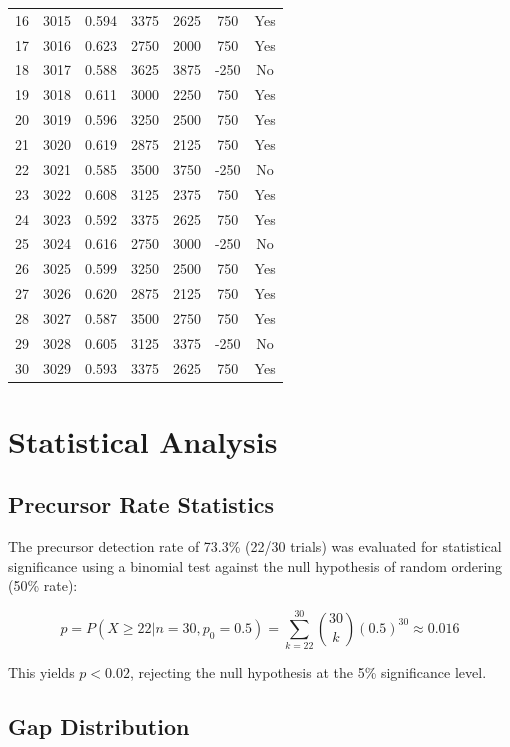 \documentclass[11pt]{article}
\begin{document}
\begin{longtable}{ccccccc}
16 & 3015 & 0.594 & 3375 & 2625 & 750 & Yes \\
17 & 3016 & 0.623 & 2750 & 2000 & 750 & Yes \\
18 & 3017 & 0.588 & 3625 & 3875 & -250 & No \\
19 & 3018 & 0.611 & 3000 & 2250 & 750 & Yes \\
20 & 3019 & 0.596 & 3250 & 2500 & 750 & Yes \\
21 & 3020 & 0.619 & 2875 & 2125 & 750 & Yes \\
22 & 3021 & 0.585 & 3500 & 3750 & -250 & No \\
23 & 3022 & 0.608 & 3125 & 2375 & 750 & Yes \\
24 & 3023 & 0.592 & 3375 & 2625 & 750 & Yes \\
25 & 3024 & 0.616 & 2750 & 3000 & -250 & No \\
26 & 3025 & 0.599 & 3250 & 2500 & 750 & Yes \\
27 & 3026 & 0.620 & 2875 & 2125 & 750 & Yes \\
28 & 3027 & 0.587 & 3500 & 2750 & 750 & Yes \\
29 & 3028 & 0.605 & 3125 & 3375 & -250 & No \\
30 & 3029 & 0.593 & 3375 & 2625 & 750 & Yes \\
\end{longtable}

\section{Statistical Analysis}

\subsection{Precursor Rate Statistics}

The precursor detection rate of 73.3\% (22/30 trials) was evaluated for statistical significance using a binomial test against the null hypothesis of random ordering (50\% rate):

\begin{equation}
p = P(X \geq 22 | n=30, p_0=0.5) = \sum_{k=22}^{30} \binom{30}{k} (0.5)^{30} \approx 0.016
\end{equation}

This yields $p < 0.02$, rejecting the null hypothesis at the 5\% significance level.

\subsection{Gap Distribution}
\end{document}
